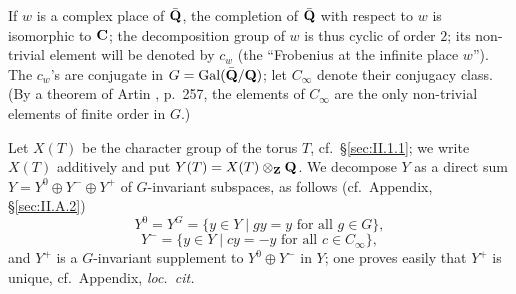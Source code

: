 


If $w$ is a complex place of $\bar{\mathbf{Q}}$, the completion of $\bar{\mathbf{Q}}$ with
respect to $w$ is isomorphic to $\mathbf{C}$; the decomposition group of $w$ is
thus cyclic of order $2$; its non-trivial element will be denoted by
$c_w$ (the ``Frobenius at the infinite place $w$'').  The $c_w$'s are
conjugate in $G = \mathrm{Gal}(\bar{\mathbf{Q}}/\mathbf{Q})$; let $C_\infty$ denote their
conjugacy class.  (By a theorem of Artin \cite{artin-collected}, p.~257,
the elements of $C_\infty$ are the only non-trivial elements of finite
order in $G$.)

Let $X(T)$ be the character group of the torus $T$, cf.~\S\ref{sec:II.1.1};
we write $X(T)$ additively and put $Y(T) = X(T) \mathbin{\otimes}_{\mathbf{Z}} \mathbf{Q}$.  We
decompose $Y$ as a direct sum $Y = Y^0 \oplus Y^- \oplus Y^+$ of
$G$-invariant subspaces, as follows (cf.~Appendix, \S\ref{sec:II.A.2})
\[
Y^0 = Y^G = \{y \in Y \mid gy = y \text{ for all } g \in G\},
\]
\[
Y^- = \{y \in Y \mid cy = -y \text{ for all } c \in C_\infty\},
\]
and $Y^+$ is a $G$-invariant supplement to $Y^0 \oplus Y^-$ in $Y$; one
proves easily that $Y^+$ is unique, cf.~Appendix, \emph{loc.~cit.}

